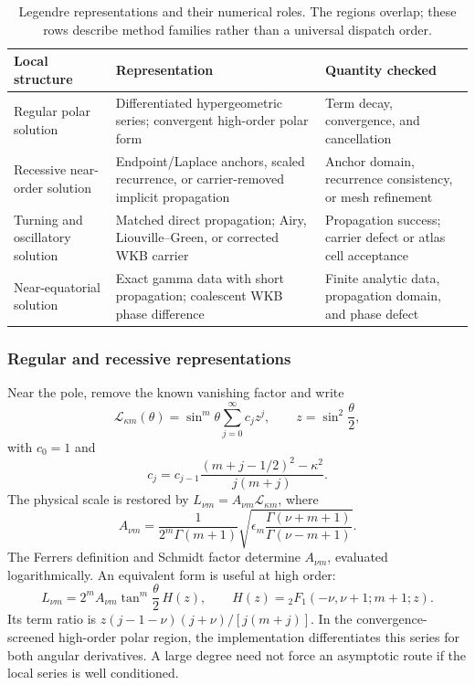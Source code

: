 ﻿\documentclass[11pt,a4paper]{article}
\begin{document}
\begin{table}[htbp]
\centering
\footnotesize
\caption{Legendre representations and their numerical roles. The regions overlap; these rows describe method families rather than a universal dispatch order.}
\label{tab:legendre_representations}
\begin{tabularx}{\textwidth}{@{}>{\raggedright\arraybackslash}p{}>{\raggedright\arraybackslash}X>{\raggedright\arraybackslash}p{}@{}}
\toprule
Local structure & Representation & Quantity checked\\
\midrule
Regular polar solution & Differentiated hypergeometric series; convergent high-order polar form & Term decay, convergence, and cancellation\\
Recessive near-order solution & Endpoint/Laplace anchors, scaled recurrence, or carrier-removed implicit propagation & Anchor domain, recurrence consistency, or mesh refinement\\
Turning and oscillatory solution & Matched direct propagation; Airy, Liouville--Green, or corrected WKB carrier & Propagation success; carrier defect or atlas cell acceptance\\
Near-equatorial solution & Exact gamma data with short propagation; coalescent WKB phase difference & Finite analytic data, propagation domain, and phase defect\\
\bottomrule
\end{tabularx}
\end{table}

\subsubsection{Regular and recessive representations}

Near the pole, remove the known vanishing factor and write
\begin{equation}
 \mathcal L_{\kappa m}(\theta)=\sin^m\theta\sum_{j=0}^{\infty}c_jz^j,
 \qquad z=\sin^2\frac{\theta}{2},
 \label{eq:legendre_polar_series}
\end{equation}
with $c_0=1$ and
\begin{equation}
 c_j=c_{j-1}
 \frac{(m+j-1/2)^2-\kappa^2}{j(m+j)}.
 \label{eq:legendre_coefficients}
\end{equation}
The physical scale is restored by $L_{\nu m}=A_{\nu m}\mathcal L_{\kappa m}$, where
\begin{equation}
 A_{\nu m}=\frac{1}{2^m\Gamma(m+1)}
 \sqrt{\epsilon_m\frac{\Gamma(\nu+m+1)}{\Gamma(\nu-m+1)}}.
 \label{eq:legendre_polar_amplitude}
\end{equation}
The Ferrers definition and Schmidt factor determine $A_{\nu m}$, evaluated logarithmically. An equivalent form is useful at high order:
\begin{equation}
 L_{\nu m}=2^mA_{\nu m}\tan^m\frac{\theta}{2}\,H(z),\qquad
 H(z)={}_2F_1(-\nu,\nu+1;m+1;z).
 \label{eq:legendre_convergent_polar_form}
\end{equation}
Its term ratio is $z(j-1-\nu)(j+\nu)/[j(m+j)]$. In the convergence-screened high-order polar region, the implementation differentiates this series for both angular derivatives. A large degree need not force an asymptotic route if the local series is well conditioned.
\end{document}
